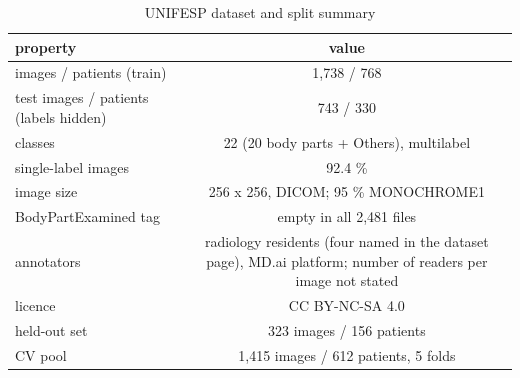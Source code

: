 \setcounter{table}{8}
\begin{table}[!ht]\centering\small
\caption{UNIFESP dataset and split summary}\label{tab:dataset}
\begin{tabular}{lc}
\toprule
\textbf{property} & \textbf{value} \\
\midrule
images / patients (train) & 1,738 / 768 \\
test images / patients (labels hidden) & 743 / 330 \\
classes & 22 (20 body parts + Others), multilabel \\
single-label images & 92.4 \% \\
image size & 256 x 256, DICOM; 95 \% MONOCHROME1 \\
BodyPartExamined tag & empty in all 2,481 files \\
annotators & radiology residents (four named in the dataset page), MD.ai platform; number of readers per image not stated \\
licence & CC BY-NC-SA 4.0 \\
held-out set & 323 images / 156 patients \\
CV pool & 1,415 images / 612 patients, 5 folds \\
\bottomrule
\end{tabular}
\par{}
\end{table}

